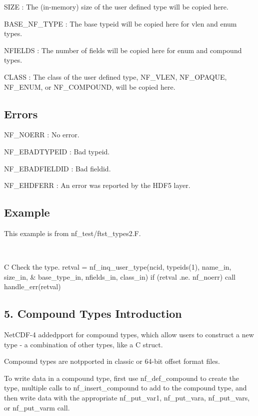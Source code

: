 {\ttfamily S\+I\+ZE} \+: The (in-\/memory) size of the user defined type will be copied here.

{\ttfamily B\+A\+S\+E\+\_\+\+N\+F\+\_\+\+T\+Y\+PE} \+: The base typeid will be copied here for vlen and enum types.

{\ttfamily N\+F\+I\+E\+L\+DS} \+: The number of fields will be copied here for enum and compound types.

{\ttfamily C\+L\+A\+SS} \+: The class of the user defined type, N\+F\+\_\+\+V\+L\+EN, N\+F\+\_\+\+O\+P\+A\+Q\+UE, N\+F\+\_\+\+E\+N\+UM, or N\+F\+\_\+\+C\+O\+M\+P\+O\+U\+ND, will be copied here.

\subsection*{Errors }

{\ttfamily N\+F\+\_\+\+N\+O\+E\+RR} \+: No error.

{\ttfamily N\+F\+\_\+\+E\+B\+A\+D\+T\+Y\+P\+E\+ID} \+: Bad typeid.

{\ttfamily N\+F\+\_\+\+E\+B\+A\+D\+F\+I\+E\+L\+D\+ID} \+: Bad fieldid.

{\ttfamily N\+F\+\_\+\+E\+H\+D\+F\+E\+RR} \+: An error was reported by the H\+D\+F5 layer.

\subsection*{Example }

This example is from nf\+\_\+test/ftst\+\_\+types2.\+F.

 

C Check the type. retval = nf\+\_\+inq\+\_\+user\+\_\+type(ncid, typeids(1), name\+\_\+in, size\+\_\+in, \& base\+\_\+type\+\_\+in, nfields\+\_\+in, class\+\_\+in) if (retval .ne. nf\+\_\+noerr) call handle\+\_\+err(retval)\hypertarget{nc_f77_interface_guide_f77_Compound-Types-Introduction}{}\subsection{5. Compound Types Introduction }\label{nc_f77_interface_guide_f77_Compound-Types-Introduction}
Net\+C\+D\+F-\/4 addedpport for compound types, which allow users to construct a new type -\/ a combination of other types, like a C struct.

Compound types are notpported in classic or 64-\/bit offset format files.

To write data in a compound type, first use nf\+\_\+def\+\_\+compound to create the type, multiple calls to nf\+\_\+insert\+\_\+compound to add to the compound type, and then write data with the appropriate nf\+\_\+put\+\_\+var1, nf\+\_\+put\+\_\+vara, nf\+\_\+put\+\_\+vars, or nf\+\_\+put\+\_\+varm call.

